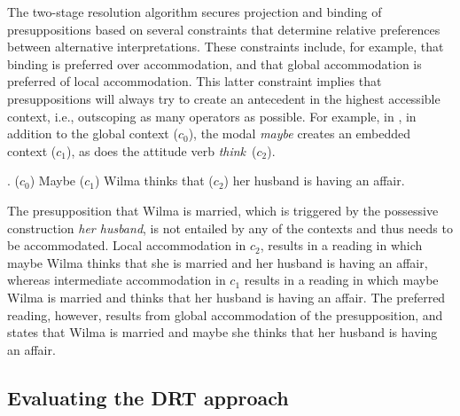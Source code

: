 \noindent The two-stage resolution algorithm secures projection and binding of
presuppositions based on several constraints that determine relative
preferences between alternative interpretations. These constraints include,
for example, that binding is preferred over accommodation, and that global
accommodation is preferred of local accommodation. This latter constraint
implies that presuppositions will always try to create an antecedent in the
highest accessible context, i.e., outscoping as many operators as possible.
For example, in \Next,
in addition to the global context ($c_0$), the modal \emph{maybe} creates an
embedded context ($c_1$), as does the attitude verb \emph{think}~($c_2$).

\ex. ($c_0$) Maybe ($c_1$) Wilma thinks that ($c_2$) her husband is having
  an affair.

The presupposition that Wilma is married, which is triggered by the
possessive construction \emph{her husband}, is not entailed by any of the
contexts and thus needs to be accommodated. Local accommodation in $c_2$,
results in a reading in which maybe Wilma thinks that she is married and her
husband is having an affair, whereas intermediate accommodation in $c_1$
results in a reading in which maybe Wilma is married and thinks that her
husband is having an affair. The preferred reading, however, results from
global accommodation of the presupposition, and states that Wilma is married
and maybe she thinks that her husband is having an affair.


\subsection{Evaluating the DRT approach}

